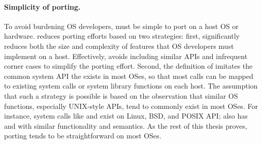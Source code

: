 \paragraph{Simplicity of porting.}
To avoid burdening OS developers,
\thehostabi{}
must be simple to port on a host OS or hardware.
\Thehostabi{} reduces porting efforts
based on two strategies:
first, \thehostabi{} significantly reduces both the size and complexity of features
that OS developers must implement on a host.
Effectively, \thehostabi{} avoids including similar APIs and infrequent corner cases
to simplify the porting effort.
Second, the definition of \thehostabi{}
imitates the common system API the exists in most OSes,
so that
most calls can be mapped to
existing system calls or system library functions
on each host.
The assumption that such a strategy is possible
is based on
the observation that
similar OS functions, especially UNIX-style APIs,
tend to commonly exist in most OSes.
For instance,
system calls like  and  exist on Linux, BSD, and POSIX API;
\win{} also has  and 
with similar functionality and semantics.
As the rest of this thesis proves, porting \thehostabi{} tends to be straightforward
on most OSes.



